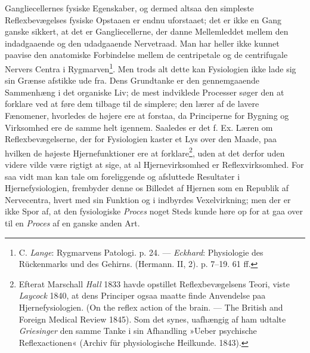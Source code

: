 \documentclass[12pt,a4paper,openany]{book}
\newcommand{\opage}[1]{\marginnote{\footnotesize\textit{[#1]}}}
\begin{document}
Gangliecellernes fysiske Egenskaber, og dermed altsaa den simpleste
Reflexbevægelses fysiske Opstaaen er endnu uforstaaet; det er ikke en
Gang ganske sikkert, at det er Gangliecellerne, der danne Mellemleddet
mellem den indadgaaende og den udadgaaende Nervetraad. Man har heller
ikke kunnet paavise den anatomiske Forbindelse mellem de centripetale og
de centrifugale Nervers Centra i Rygmarven\footnote[2]{C. \emph{Lange}:
Rygmarvens Patologi. p. 24. --- \emph{Eckhard}: Physiologie des
Rückenmarks und des Gehirns. (Hermann. II, 2). p. 7--19. 61 ff.}. Men
trods
\opage{70}alt dette kan Fysiologien ikke lade sig sin Grænse afstikke
ude fra. Dens Grundtanke er den gennemgaaende Sammenhæng i det organiske
Liv; de mest indviklede Processer søger den at forklare ved at føre dem
tilbage til de simplere; den lærer af de lavere Fænomener, hvorledes de
højere ere at forstaa, da Principerne for Bygning og Virksomhed ere de
samme helt igennem. Saaledes er det f. Ex. Læren om Reflexbevægelserne,
der for Fysiologien kaster et Lys over den Maade, paa hvilken de højeste
Hjernefunktioner ere at forklare\footnote[1]{Efterat Marschall
\emph{Hall} 1833 havde opstillet Reflexbevægelsens Teori, viste
\emph{Laycock} 1840, at dens Principer ogsaa maatte finde Anvendelse paa
Hjernefysiologien. (On the reflex action of the brain. --- The British
and Foreign Medical Review 1845). Som det synes, uafhængig af ham
udtalte \emph{Griesinger} den samme Tanke i sin Afhandling »Ueber
psychische Reflexactionen« (Archiv für physiologische Heilkunde.
1843).}, uden at det derfor uden videre vilde være rigtigt at sige, at
al Hjernevirksomhed er Reflexvirksomhed. For saa vidt man kan tale om
foreliggende og afsluttede Resultater i Hjernefysiologien, frembyder
denne os Billedet af Hjernen som en Republik af Nervecentra, hvert med
sin Funktion og i indbyrdes Vexelvirkning; men der er ikke Spor af, at
den fysiologiske \emph{Proces} noget Steds kunde høre op for at gaa over
til en \emph{Proces} af en ganske anden Art.
\end{document}
